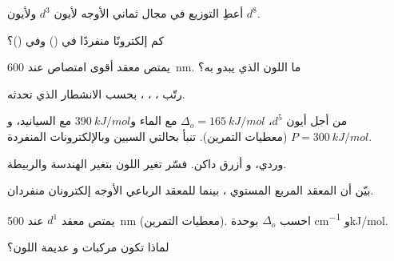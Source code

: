 \begin{exercise}[$\star$]\label{exo:b2:ligand-field:1}
أعطِ التوزيع في مجال ثماني الأوجه  لأيون $d^3$ ولأيون $d^8$.
\end{exercise}

\begin{exercise}[$\star$]\label{exo:b2:ligand-field:2}
كم إلكترونًا منفردًا في  () وفي  ()؟
\end{exercise}

\begin{exercise}[$\star$]\label{exo:b2:ligand-field:3}
يمتص معقد أقوى امتصاص عند \qty{600}{nm}. ما اللون الذي يبدو به؟
\end{exercise}

\begin{exercise}[$\star$]\label{exo:b2:ligand-field:4}
رتّب ، ، ،  بحسب الانشطار الذي تحدثه.
\end{exercise}

\begin{exercise}[$\star\star$]\label{exo:b2:ligand-field:5}
من أجل أيون $d^5$، $\Delta_o = \qty{165}{kJ/mol}$ مع الماء و$\qty{390}{kJ/mol}$ مع السيانيد،
و$P = \qty{300}{kJ/mol}$ (معطيات التمرين). تنبأ بحالتي السبين وبالإلكترونات
المنفردة.
\end{exercise}

\begin{exercise}[$\star\star$]\label{exo:b2:ligand-field:6}
 وردي، و أزرق داكن. فسّر تغير اللون بتغير
الهندسة والربيطة.
\end{exercise}

\begin{exercise}[$\star\star$]\label{exo:b2:ligand-field:7}
بيّن أن المعقد المربع المستوي  ، بينما للمعقد الرباعي الأوجه
 إلكترونان منفردان.
\end{exercise}

\begin{exercise}[$\star\star$]\label{exo:b2:ligand-field:8}
يمتص معقد $d^1$ عند \qty{500}{nm} (معطيات التمرين). احسب $\Delta_o$ بوحدة \unit{cm^{-1}} 
و\unit{kJ/mol}.
\end{exercise}

\begin{exercise}[$\star\star$]\label{exo:b2:ligand-field:9}
لماذا تكون مركبات  و عديمة اللون؟
\end{exercise}

